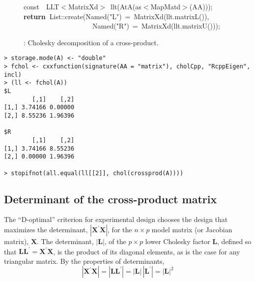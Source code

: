 \documentclass[shortnames,article,nojss]{jss}
\newcommand{\hlstd}[1]{\textcolor[rgb]{0,0,0}{#1}}
\newcommand{\hlopt}[1]{\textcolor[rgb]{0,0,0}{#1}}
\newcommand{\hlstr}[1]{\textcolor[rgb]{0.90,0.15,0.15}{#1}}
\newcommand{\hlkwa}[1]{\textcolor[rgb]{0.61,0.13,0.93}{\bf{#1}}}
\newcommand{\hlkwb}[1]{\textcolor[rgb]{0.13,0.54,0.13}{#1}}
\newcommand{\hlkwd}[1]{\textcolor[rgb]{0,0,0}{#1}}
\begin{document}
\begin{figure}[htb]
  \noindent
  \ttfamily
  \hlstd{}\hlkwb{const}\hlstd{\ \ }\hlkwb{}\hlstd{LLT}\hlopt{$<$}\hlstd{MatrixXd}\hlopt{$>$\ }\hlstd{}\hlkwd{llt}\hlstd{}\hlopt{(}\hlstd{}\hlkwd{AtA}\hlstd{}\hlopt{(}\hlstd{as}\hlopt{$<$}\hlstd{MapMatd}\hlopt{$>$(}\hlstd{AA}\hlopt{)));}\hspace*{\fill}\\
  \hlstd{}\hlkwa{return\ }\hlstd{List}\hlopt{::}\hlstd{}\hlkwd{create}\hlstd{}\hlopt{(}\hlstd{Named}\hlopt{{(}}\hlstd{}\hlstr{"L"}\hlstd{}\hlopt{{)}\ =\ }\hlstd{}\hlkwd{MatrixXd}\hlstd{}\hlopt{(}\hlstd{llt}\hlopt{.}\hlstd{}\hlkwd{matrixL}\hlstd{}\hlopt{()),}\hspace*{\fill}\\
  \hlstd{}\hlstd{\ \ \ \ \ \ \ \ \ \ \ \ \ \ \ \ \ \ \ \ }\hlstd{Named}\hlopt{{(}}\hlstd{}\hlstr{"R"}\hlstd{}\hlopt{{)}\ =\ }\hlstd{}\hlkwd{MatrixXd}\hlstd{}\hlopt{(}\hlstd{llt}\hlopt{.}\hlstd{}\hlkwd{matrixU}\hlstd{}\hlopt{()));}\hlstd{}\hspace*{\fill}\\
  \mbox{}
  \normalfont
  \normalsize
  \caption{: Cholesky decomposition of a cross-product.}
  \label{chol}
\end{figure}

\begin{verbatim}
> storage.mode(A) <- "double"
> fchol <- cxxfunction(signature(AA = "matrix"), cholCpp, "RcppEigen", incl)
> (ll <- fchol(A))
$L
        [,1]    [,2]
[1,] 3.74166 0.00000
[2,] 8.55236 1.96396

$R
        [,1]    [,2]
[1,] 3.74166 8.55236
[2,] 0.00000 1.96396

> stopifnot(all.equal(ll[[2]], chol(crossprod(A))))
\end{verbatim}



\subsection{Determinant of the cross-product matrix}
\label{sec:determinant}

The ``D-optimal'' criterion for experimental design chooses the design
that maximizes the determinant, $|\bm X^\prime\bm X|$, for the
$n\times p$ model matrix (or Jacobian matrix), $\bm X$.  The
determinant, $|\bm L|$, of the $p\times p$ lower Cholesky factor
$\bm L$, defined so that $\bm L\bm L^\prime=\bm X^\prime\bm X$, is
the product of its diagonal elements, as is the case for any
triangular matrix.  By the properties of determinants,
\begin{displaymath}
  |\bm X^\prime\bm X|=|\bm L\bm L^\prime|=|\bm L|\,|\bm L^\prime|=|\bm L|^2
\end{displaymath}
\end{document}
